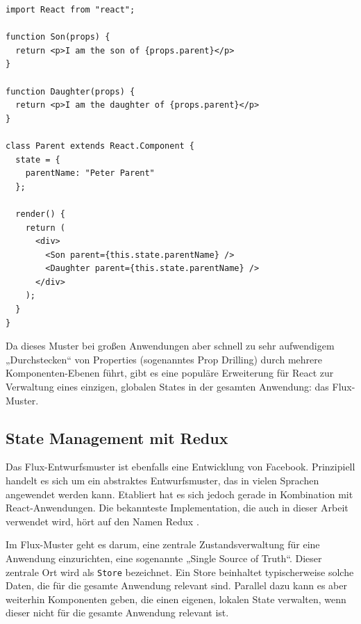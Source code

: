\begin{minipage}{\linewidth}
\begin{lstlisting}[caption={„Lifting state up“: Mehrere Komponenten greifen auf die gleichen Daten zu.}]
import React from "react";

function Son(props) {
  return <p>I am the son of {props.parent}</p>
}

function Daughter(props) {
  return <p>I am the daughter of {props.parent}</p>
}

class Parent extends React.Component {
  state = {
    parentName: "Peter Parent"
  };

  render() {
    return (
      <div>
        <Son parent={this.state.parentName} />
        <Daughter parent={this.state.parentName} />
      </div>
    );
  }
}
\end{lstlisting}
\end{minipage}

Da dieses Muster bei großen Anwendungen aber schnell zu sehr aufwendigem „Durchstecken“ von Properties (sogenanntes Prop Drilling) durch mehrere Komponenten-Ebenen führt, gibt es eine populäre Erweiterung für React zur Verwaltung eines einzigen, globalen States in der gesamten Anwendung: das Flux-Muster\cite{web:flux_doku}.


\subsection{State Management mit Redux}
Das Flux-Entwurfsmuster ist ebenfalls eine Entwicklung von Facebook. Prinzipiell handelt es sich um ein abstraktes Entwurfsmuster, das in vielen Sprachen angewendet werden kann. Etabliert hat es sich jedoch gerade in Kombination mit React-Anwendungen. Die bekannteste Implementation, die auch in dieser Arbeit verwendet wird, hört auf den Namen Redux \cite{web:redux}.

Im Flux-Muster geht es darum, eine zentrale Zustandsverwaltung für eine Anwendung einzurichten, eine sogenannte „Single Source of Truth“. Dieser zentrale Ort wird als \texttt{Store} bezeichnet. Ein Store beinhaltet typischerweise solche Daten, die für die gesamte Anwendung relevant sind. Parallel dazu kann es aber weiterhin Komponenten geben, die einen eigenen, lokalen State verwalten, wenn dieser nicht für die gesamte Anwendung relevant ist.

